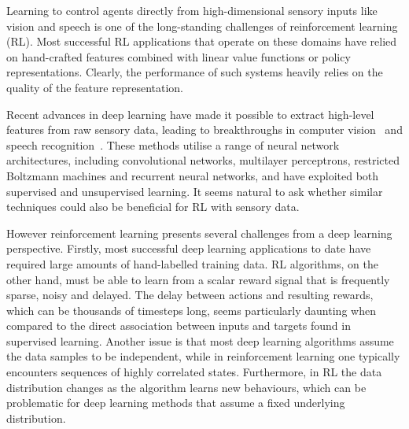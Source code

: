 Learning to control agents directly from high-dimensional sensory inputs like vision and speech is one of the long-standing challenges of reinforcement learning (RL). 
Most successful RL applications that operate on these domains have relied on hand-crafted features combined with linear value functions or policy representations. 
Clearly, the performance of such systems heavily relies on the quality of the feature representation. %

Recent advances in deep learning have made it possible to extract high-level features from raw sensory data, leading to breakthroughs in computer vision~\cite{krizhevsky-imagenet, sermanet-cvpr-2013, mnih-thesis} and speech recognition~\cite{dahl-speech,graves-speech}.
These methods utilise a range of neural network architectures, including convolutional networks, multilayer perceptrons, restricted Boltzmann machines and recurrent neural networks, and have exploited both supervised and unsupervised learning. 
It seems natural to ask whether similar techniques could also be beneficial for RL with sensory data.

% 
% 
% 

However reinforcement learning presents several challenges from a deep learning perspective.
Firstly, most successful deep learning applications to date have required large amounts of hand-labelled training data.
RL algorithms, on the other hand, must be able to learn from a scalar reward signal that is frequently sparse, noisy and delayed.
The delay between actions and resulting rewards, which can be thousands of timesteps long, seems particularly daunting when compared to the direct association between inputs and targets found in supervised learning.
Another issue is that most deep learning algorithms assume the data samples to be independent, while in reinforcement learning one typically encounters sequences of highly correlated states.
Furthermore, in RL the data distribution changes as the algorithm learns new behaviours, which can be problematic for deep learning methods that assume a fixed underlying distribution.

